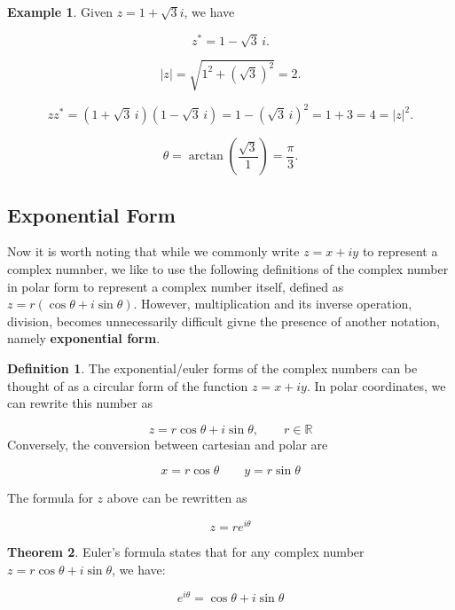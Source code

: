 \documentclass[12pt]{article}
\theoremstyle{definition}
\newtheorem{theorem}{Theorem}[section]
\newtheorem{definition}[theorem]{Definition}
\newtheorem*{example}{Example}
\begin{document}
\begin{example}
    Given $z = 1 + \sqrt{3}i$, we have

    $$z^* = 1-\sqrt{3}\,i.$$

    $$|z|=\sqrt{1^2+(\sqrt{3})^2}=2.$$

    $$zz^*=(1+\sqrt{3}\,i)(1-\sqrt{3}\,i)=1-(\sqrt{3}\,i)^2=1+3=4=|z|^2.$$

    $$\theta=\arctan\!\left(\dfrac{\sqrt{3}}{1}\right)=\dfrac{\pi}{3}.$$

\end{example}


\subsection{Exponential Form}

Now it is worth noting that while we commonly write $z = x + iy$ to represent a complex numnber, we like to use the following definitions of the complex number in polar form to represent a complex number itself, defined as $z = r (\cos \theta + i \sin \theta)$. However, multiplication and its inverse operation, division, becomes unnecessarily difficult givne the presence of another notation, namely \textbf{exponential form}. 


\begin{definition}
    The exponential/euler forms of the complex numbers can be thought of as a circular form of the function $z = x + iy$. In polar coordinates, we can rewrite this number as 

    $$
        z = r \cos \theta + i \sin \theta, \qquad r \in \mathbb{R}
    $$
    Conversely, the conversion between cartesian and polar are 
    
    $$
    x = r \cos \theta \qquad y = r \sin \theta
    $$
    
    The formula for $z$ above can be rewritten as 

    $$z = r e^{i\theta}$$
\end{definition}


\begin{theorem}
    Euler's formula states that for any complex number $z = r \cos \theta + i \sin \theta$, we have:

    $$
    e^{i \theta} = \cos \theta + i \sin \theta
    $$
\end{theorem}
\end{document}
